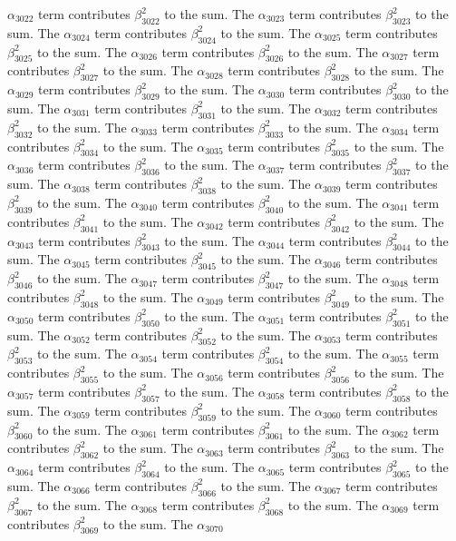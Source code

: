 \begin{lemma}
$\alpha_{3022}$ term contributes $\beta_{3022}^{2}$ to the sum. The $\alpha_{3023}$ term contributes $\beta_{3023}^{2}$ to the sum. The $\alpha_{3024}$ term contributes $\beta_{3024}^{2}$ to the sum. The $\alpha_{3025}$ term contributes $\beta_{3025}^{2}$ to the sum. The $\alpha_{3026}$ term contributes $\beta_{3026}^{2}$ to the sum. The $\alpha_{3027}$ term contributes $\beta_{3027}^{2}$ to the sum. The $\alpha_{3028}$ term contributes $\beta_{3028}^{2}$ to the sum. The $\alpha_{3029}$ term contributes $\beta_{3029}^{2}$ to the sum. The $\alpha_{3030}$ term contributes $\beta_{3030}^{2}$ to the sum. The $\alpha_{3031}$ term contributes $\beta_{3031}^{2}$ to the sum. The $\alpha_{3032}$ term contributes $\beta_{3032}^{2}$ to the sum. The $\alpha_{3033}$ term contributes $\beta_{3033}^{2}$ to the sum. The $\alpha_{3034}$ term contributes $\beta_{3034}^{2}$ to the sum. The $\alpha_{3035}$ term contributes $\beta_{3035}^{2}$ to the sum. The $\alpha_{3036}$ term contributes $\beta_{3036}^{2}$ to the sum. The $\alpha_{3037}$ term contributes $\beta_{3037}^{2}$ to the sum. The $\alpha_{3038}$ term contributes $\beta_{3038}^{2}$ to the sum. The $\alpha_{3039}$ term contributes $\beta_{3039}^{2}$ to the sum. The $\alpha_{3040}$ term contributes $\beta_{3040}^{2}$ to the sum. The $\alpha_{3041}$ term contributes $\beta_{3041}^{2}$ to the sum. The $\alpha_{3042}$ term contributes $\beta_{3042}^{2}$ to the sum. The $\alpha_{3043}$ term contributes $\beta_{3043}^{2}$ to the sum. The $\alpha_{3044}$ term contributes $\beta_{3044}^{2}$ to the sum. The $\alpha_{3045}$ term contributes $\beta_{3045}^{2}$ to the sum. The $\alpha_{3046}$ term contributes $\beta_{3046}^{2}$ to the sum. The $\alpha_{3047}$ term contributes $\beta_{3047}^{2}$ to the sum. The $\alpha_{3048}$ term contributes $\beta_{3048}^{2}$ to the sum. The $\alpha_{3049}$ term contributes $\beta_{3049}^{2}$ to the sum. The $\alpha_{3050}$ term contributes $\beta_{3050}^{2}$ to the sum. The $\alpha_{3051}$ term contributes $\beta_{3051}^{2}$ to the sum. The $\alpha_{3052}$ term contributes $\beta_{3052}^{2}$ to the sum. The $\alpha_{3053}$ term contributes $\beta_{3053}^{2}$ to the sum. The $\alpha_{3054}$ term contributes $\beta_{3054}^{2}$ to the sum. The $\alpha_{3055}$ term contributes $\beta_{3055}^{2}$ to the sum. The $\alpha_{3056}$ term contributes $\beta_{3056}^{2}$ to the sum. The $\alpha_{3057}$ term contributes $\beta_{3057}^{2}$ to the sum. The $\alpha_{3058}$ term contributes $\beta_{3058}^{2}$ to the sum. The $\alpha_{3059}$ term contributes $\beta_{3059}^{2}$ to the sum. The $\alpha_{3060}$ term contributes $\beta_{3060}^{2}$ to the sum. The $\alpha_{3061}$ term contributes $\beta_{3061}^{2}$ to the sum. The $\alpha_{3062}$ term contributes $\beta_{3062}^{2}$ to the sum. The $\alpha_{3063}$ term contributes $\beta_{3063}^{2}$ to the sum. The $\alpha_{3064}$ term contributes $\beta_{3064}^{2}$ to the sum. The $\alpha_{3065}$ term contributes $\beta_{3065}^{2}$ to the sum. The $\alpha_{3066}$ term contributes $\beta_{3066}^{2}$ to the sum. The $\alpha_{3067}$ term contributes $\beta_{3067}^{2}$ to the sum. The $\alpha_{3068}$ term contributes $\beta_{3068}^{2}$ to the sum. The $\alpha_{3069}$ term contributes $\beta_{3069}^{2}$ to the sum. The $\alpha_{3070}$ 
\end{lemma}
